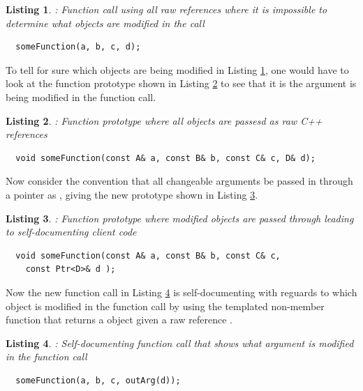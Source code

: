 \documentclass[pdf,ps2pdf,11pt]{SANDreport}
\newtheorem{listing}{Listing}
\begin{document}
{}\begin{listing}: Function call using all raw references where it is
impossible to determine what objects are modified in the call
\label{listing:fun-call-raw-refs}
{\small\begin{verbatim}
  someFunction(a, b, c, d);
\end{verbatim}}
\end{listing}


To tell for sure which objects are being modified in Listing
{}\ref{listing:fun-call-raw-refs}, one would have to look at the
function prototype shown in Listing {}\ref{listing:fun-decl-raw-refs}
to see that it is the {} argument is being modified in the
function call.


{}\begin{listing}: Function prototype where all objects are passesd as
raw C++ references
\label{listing:fun-decl-raw-refs}
{\small\begin{verbatim}
  void someFunction(const A& a, const B& b, const C& c, D& d);
\end{verbatim}}
\end{listing}


Now consider the convention that all changeable arguments be passed in
through a pointer as {}, giving the new prototype
shown in Listing {}\ref{listing:fun-decl-ptr-changed-objs}.


{}\begin{listing}: Function prototype where modified objects are
passed through {} leading to self-documenting client code
\label{listing:fun-decl-ptr-changed-objs}
{\small\begin{verbatim}
  void someFunction(const A& a, const B& b, const C& c,
    const Ptr<D>& d );
\end{verbatim}}
\end{listing}


Now the new function call in Listing
{}\ref{listing:fun-call-ptr-changed-obj} is self-documenting with
reguards to which object is modified in the function call by using the
{} templated non-member function that returns a
{} object given a raw reference {}.


{}\begin{listing}: Self-documenting function call that shows what
argument is modified in the function call
\label{listing:fun-call-ptr-changed-obj}
{\small\begin{verbatim}
  someFunction(a, b, c, outArg(d));
\end{verbatim}}
\end{listing}
\end{document}
